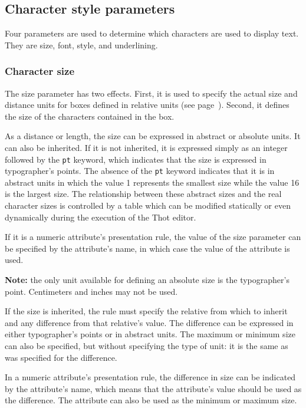 \subsection{Character style parameters}

Four parameters are used to determine which characters are used to
display text.  They are size, font, style, and underlining.

\subsubsection{Character size}

The size parameter has two effects.  First, it is used to specify the
actual size and distance units for boxes defined in relative units
(see page~\pageref{unites}).  Second, it defines the size of the
characters contained in the box.

As a distance or length, the size can be expressed in abstract or
absolute units.  It can also be inherited.  If it is not inherited, it
is expressed simply as an integer followed by the {\tt pt} keyword,
which indicates that the size is expressed in typographer's points.
The absence of the {\tt pt} keyword indicates that it is in abstract
units in which the value 1 represents the smallest size while the
value 16 is the largest size.  The relationship between these abstract
sizes and the real character sizes is controlled by a table which can
be modified statically or even dynamically during the execution of the
Thot editor.

If it is a numeric attribute's presentation rule, the value of the
size parameter can be specified by the attribute's name, in which case
the value of the attribute is used.

{\bf Note:} the only unit available for  defining an absolute size is
the typographer's point.  Centimeters and inches may not be used.

If the size is inherited, the rule must specify the relative from
which to inherit and any difference from that relative's value.  The
difference can be expressed in either typographer's points or in
abstract units.  The maximum or minimum size can also be specified,
but without specifying the type of unit: it is the same as was
specified for the difference.

In a numeric attribute's presentation rule, the difference in size can
be indicated by the attribute's name, which means that the attribute's
value should be used as the difference.  The attribute can also be
used as the minimum or maximum size.

